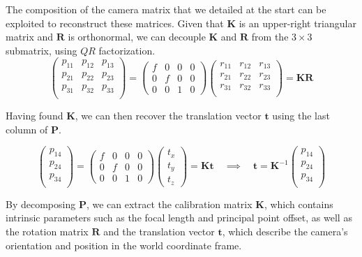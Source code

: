 \documentclass[12pt]{article}
\begin{document}
The composition of the camera matrix that we detailed at the start can be exploited to reconstruct these matrices. Given that $\mathbf{K}$ is an upper-right triangular matrix and $\mathbf{R}$ is orthonormal, we can decouple $\mathbf{K}$ and $\mathbf{R}$ from the $3\times 3$ submatrix, using $QR$ factorization.
$$
\begin{pmatrix}
    p_{11} & p_{12} & p_{13} \\
    p_{21} & p_{22} & p_{23} \\
    p_{31} & p_{32} & p_{33} \\
\end{pmatrix} = 
\begin{pmatrix}
    f & 0 & 0 & 0 \\
    0 & f & 0 & 0 \\
    0 & 0 & 1 & 0
\end{pmatrix}
\begin{pmatrix}
    r_{11} & r_{12} & r_{13} \\
    r_{21} & r_{22} & r_{23} \\
    r_{31} & r_{32} & r_{33} \\
\end{pmatrix}
= \mathbf{KR}
$$

Having found $\mathbf{K}$, we can then recover the translation vector $\mathbf{t}$ using the last column of $\mathbf{P}$.

$$
\begin{pmatrix}
    p_{14} \\ p_{24} \\ p_{34} \\
\end{pmatrix} = 
\begin{pmatrix}
    f & 0 & 0 & 0 \\
    0 & f & 0 & 0 \\
    0 & 0 & 1 & 0
\end{pmatrix}
\begin{pmatrix}
    t_x \\ t_y \\ t_z
\end{pmatrix}
= \mathbf{Kt}
\quad\implies\quad
\mathbf{t} = \mathbf{K}^{-1}
\begin{pmatrix}
    p_{14} \\ p_{24} \\ p_{34} \\
\end{pmatrix}
$$

By decomposing \( \mathbf{P} \), we can extract the calibration matrix \( \mathbf{K} \), which contains intrinsic parameters such as the focal length and principal point offset, as well as the rotation matrix \( \mathbf{R} \) and the translation vector \( \mathbf{t} \), which describe the camera’s orientation and position in the world coordinate frame.
\end{document}
